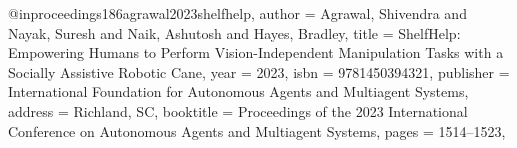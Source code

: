 @inproceedings{186agrawal2023shelfhelp,
author = {Agrawal, Shivendra and Nayak, Suresh and Naik, Ashutosh and Hayes, Bradley},
title = {ShelfHelp: Empowering Humans to Perform Vision-Independent Manipulation Tasks with a Socially Assistive Robotic Cane},
year = {2023},
isbn = {9781450394321},
publisher = {International Foundation for Autonomous Agents and Multiagent Systems},
address = {Richland, SC},
booktitle = {Proceedings of the 2023 International Conference on Autonomous Agents and Multiagent Systems},
pages = {1514–1523},
}